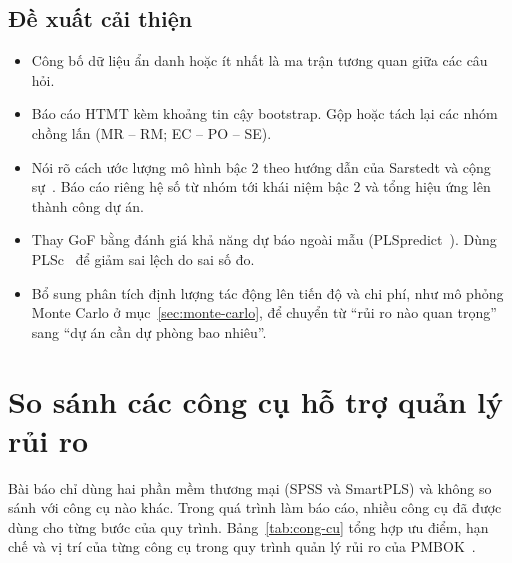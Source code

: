 \subsection{Đề xuất cải thiện}

\begin{itemize}
  \item Công bố dữ liệu ẩn danh hoặc ít nhất là ma trận tương quan giữa các câu hỏi.
  \item Báo cáo HTMT kèm khoảng tin cậy bootstrap. Gộp hoặc tách lại các nhóm chồng lấn (MR -- RM; EC -- PO -- SE).
  \item Nói rõ cách ước lượng mô hình bậc 2 theo hướng dẫn của Sarstedt và cộng sự~\cite{sarstedt2019hoc}. Báo cáo riêng hệ số từ nhóm tới khái niệm bậc 2 và tổng hiệu ứng lên thành công dự án.
  \item Thay GoF bằng đánh giá khả năng dự báo ngoài mẫu (PLSpredict~\cite{shmueli2019}). Dùng PLSc~\cite{dijkstra2015} để giảm sai lệch do sai số đo.
  \item Bổ sung phân tích định lượng tác động lên tiến độ và chi phí, như mô phỏng Monte Carlo ở mục~\ref{sec:monte-carlo}, để chuyển từ ``rủi ro nào quan trọng'' sang ``dự án cần dự phòng bao nhiêu''.
\end{itemize}

\section{So sánh các công cụ hỗ trợ quản lý rủi ro}
\label{sec:cong-cu}

Bài báo chỉ dùng hai phần mềm thương mại (SPSS và SmartPLS) và không so sánh với công cụ nào khác. Trong quá trình làm báo cáo, nhiều công cụ đã được dùng cho từng bước của quy trình. Bảng~\ref{tab:cong-cu} tổng hợp ưu điểm, hạn chế và vị trí của từng công cụ trong quy trình quản lý rủi ro của PMBOK~\cite{pmbok6}.

